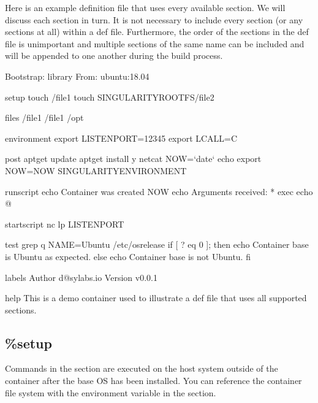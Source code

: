 \documentclass[letterpaper,10pt,english]{sphinxmanual}
\begin{document}
Here is an example definition file that uses every available section. We will
discuss each section in turn. It is not necessary to include every section (or
any sections at all) within a def file. Furthermore, the order of the sections
in the def file is unimportant and multiple sections of the same name can be
included and will be appended to one another during the build process.

%
\begin{sphinxVerbatim}[commandchars=\\\{\}]
Bootstrap: library
From: ubuntu:18.04

\PYGZpc{}setup
    touch /file1
    touch \PYGZdl{}\PYGZob{}SINGULARITY\PYGZus{}ROOTFS\PYGZcb{}/file2

\PYGZpc{}files
    /file1
    /file1 /opt

\PYGZpc{}environment
    export LISTEN\PYGZus{}PORT=12345
    export LC\PYGZus{}ALL=C

\PYGZpc{}post
    apt\PYGZhy{}get update \PYGZam{}\PYGZam{} apt\PYGZhy{}get install \PYGZhy{}y netcat
    NOW={}`date{}`
    echo \PYGZdq{}export NOW=\PYGZbs{}\PYGZdq{}\PYGZdl{}\PYGZob{}NOW\PYGZcb{}\PYGZbs{}\PYGZdq{}\PYGZdq{} \PYGZgt{}\PYGZgt{} \PYGZdl{}SINGULARITY\PYGZus{}ENVIRONMENT

\PYGZpc{}runscript
    echo \PYGZdq{}Container was created \PYGZdl{}NOW\PYGZdq{}
    echo \PYGZdq{}Arguments received: \PYGZdl{}*\PYGZdq{}
    exec echo \PYGZdq{}\PYGZdl{}@\PYGZdq{}

\PYGZpc{}startscript
    nc \PYGZhy{}lp \PYGZdl{}LISTEN\PYGZus{}PORT

\PYGZpc{}test
    grep \PYGZhy{}q NAME=\PYGZbs{}\PYGZdq{}Ubuntu\PYGZbs{}\PYGZdq{} /etc/os\PYGZhy{}release
    if [ \PYGZdl{}? \PYGZhy{}eq 0 ]; then
        echo \PYGZdq{}Container base is Ubuntu as expected.\PYGZdq{}
    else
        echo \PYGZdq{}Container base is not Ubuntu.\PYGZdq{}
    fi

\PYGZpc{}labels
    Author d@sylabs.io
    Version v0.0.1

\PYGZpc{}help
    This is a demo container used to illustrate a def file that uses all
    supported sections.
\end{sphinxVerbatim}


\subsection{\%setup}
\label{\detokenize{definition_files:setup}}
Commands in the  section are executed on the host system outside of
the container after the base OS has been installed. You can reference the
container file system with the  environment variable in
the  section.
\end{document}
